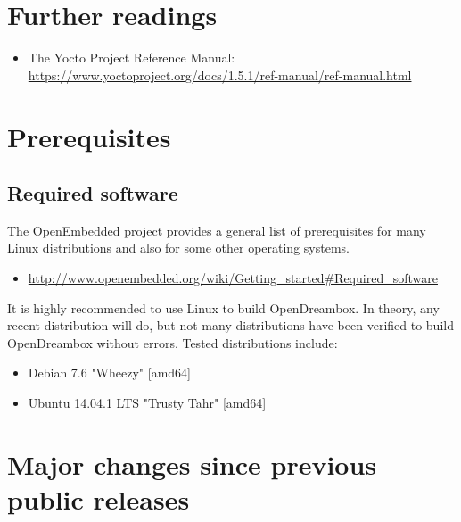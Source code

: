 \documentclass[a4paper]{article}
\begin{document}
\section{Further readings}
      \begin{itemize}
        \item The Yocto Project Reference Manual:
              \url{https://www.yoctoproject.org/docs/1.5.1/ref-manual/ref-manual.html}
      \end{itemize}

\section{Prerequisites}
  \label{prerequisites}

  \subsection{Required software}

   The OpenEmbedded project provides a general list of prerequisites for
   many Linux distributions and also for some other operating systems.

   \begin{itemize}
     \item \url{http://www.openembedded.org/wiki/Getting\_started#Required\_software}
   \end{itemize}

   It is highly recommended to use Linux to build OpenDreambox. In theory,
   any recent distribution will do, but not many distributions have been
   verified to build OpenDreambox without errors. Tested distributions
   include:

   \begin{itemize}
     \item Debian 7.6 "Wheezy" [amd64]
     \item Ubuntu 14.04.1 LTS "Trusty Tahr" [amd64]
   \end{itemize}

\pagebreak

\section{Major changes since previous public releases}
\end{document}
